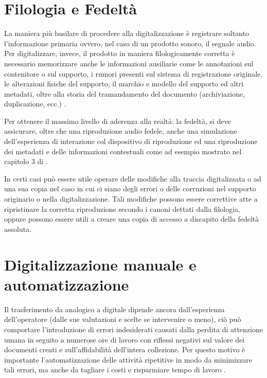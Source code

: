 \section{Filologia e Fedeltà} \label{sec:filologia-fedeltà}
La maniera più basilare di procedere alla digitalizzazione è registrare soltanto l'informazione primaria ovvero, nel caso di un prodotto sonoro, il segnale audio.
Per digitalizzare, invece, il prodotto in maniera filologicamente corretta è necessario memorizzare anche le informazioni ausiliarie come le annotazioni sul contenitore o sul supporto, i rumori presenti sul sistema di registrazione originale, le alterazioni fisiche del supporto, il marchio e modello del supporto ed altri metadati, oltre alla storia del tramandamento del documento (archiviazione, duplicazione, ecc.) \cite[p. 59]{prettoComputingMethodologiesSupporting2018}.

Per ottenere il massimo livello di aderenza alla realtà: la fedeltà, si deve assicurare, oltre che una riproduzione audio fedele, anche una simulazione dell'esperienza di interazione col dispositivo di riproduzione ed una riproduzione dei metadati e delle informazioni contestuali come ad esempio mostrato nel capitolo 3 di \textcite{fantozziTapeMusicArchives2017}.

In certi casi può essere utile operare delle modifiche alla traccia digitalizzata o ad una sua copia nel caso in cui ci siano degli errori o delle corruzioni nel supporto originario o nella digitalizzazione. Tali modifiche possono essere correttive atte a ripristinare la corretta riproduzione secondo i canoni dettati dalla filologia, oppure possono essere utili a creare una copia di accesso a discapito della fedeltà assoluta.

\section{Digitalizzazione manuale e automatizzazione} \label{sec:digitalizzazione-man-vs-auto}
Il trasferimento da analogico a digitale dipende ancora dall'esperienza dell'operatore (dalle sue valutazioni e scelte se intervenire o meno), ciò può comportare l'introduzione di errori indesiderati causati dalla perdita di attenzione umana in seguito a numerose ore di lavoro con riflessi negativi sul valore dei documenti creati e sull'affidabilità dell'intera collezione.
Per questo motivo è importante l'automatizzazione delle attività ripetitive in modo da minimizzare tali errori, ma anche da tagliare i costi e risparmiare tempo di lavoro \cite[cap. 2.1]{fantozziTapeMusicArchives2017}.

